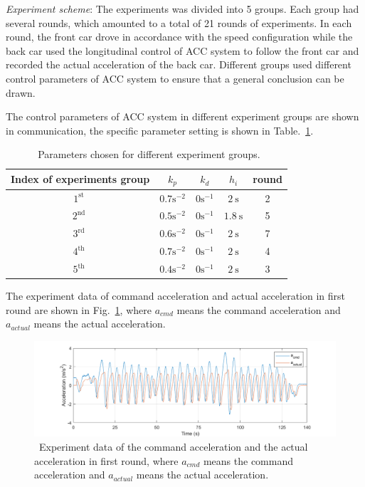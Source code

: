 \documentclass[trsc,nonblindrev]{informs3} %
\begin{document}
\begin{APPENDICES}
    \textit{Experiment scheme}: The experiments was divided into 5 groups. Each group had several rounds, which amounted to a total of 21 rounds of experiments. In each round, the front car drove in accordance with the speed configuration while the back car used the longitudinal control of ACC system to follow the front car and recorded the actual acceleration of the back car. Different groups used different control parameters of ACC system to ensure that a general conclusion can be drawn.

    The control parameters of ACC system in different experiment groups are shown in communication, the specific parameter setting is shown in Table.~\ref{table 2}.
    \begin{table}
        \centering
        \caption{~Parameters chosen for different experiment groups.}
        \begin{tabular}{ccccc}
            \hline Index of experiments group & $k_{p}$               & $k_{d}$              & $h_{i}$           & round \\
            \hline $1^{\text {st }}$          & $0.7 \mathrm{s}^{-2}$ & $0  \mathrm{s}^{-1}$ & $2 \mathrm{~s}$   & 2     \\
            \hline $2^{\text {nd }}$          & $0.5 \mathrm{s}^{-2}$ & $0  \mathrm{s}^{-1}$ & $1.8 \mathrm{~s}$ & 5     \\
            \hline $3^{\text {rd }}$          & $0.6 \mathrm{s}^{-2}$ & $0  \mathrm{s}^{-1}$ & $2 \mathrm{~s}$   & 7     \\
            \hline $4^{\text {th }}$          & $0.7 \mathrm{s}^{-2}$ & $0  \mathrm{s}^{-1}$ & $2 \mathrm{~s}$   & 4     \\
            \hline $5^{\text {th }}$          & $0.4 \mathrm{s}^{-2}$ & $0  \mathrm{s}^{-1}$ & $2 \mathrm{~s}$   & 3     \\
            \hline
        \end{tabular}
        \label{table 2}
    \end{table}

    The experiment data of command acceleration and actual acceleration in first round are shown in Fig.~\ref{fig14}, where $a_{cmd}$ means the command acceleration and $a_{actual}$ means the actual acceleration.

    \begin{figure}
        \centering
        \includegraphics[width=14cm]{figs/fig14.png}
        \caption{~Experiment data of the command acceleration and the actual acceleration in first round, where $a_{cmd}$ means the command acceleration and $a_{actual}$ means the actual acceleration.}
        \label{fig14}
    \end{figure}


\end{APPENDICES}
\end{document}
